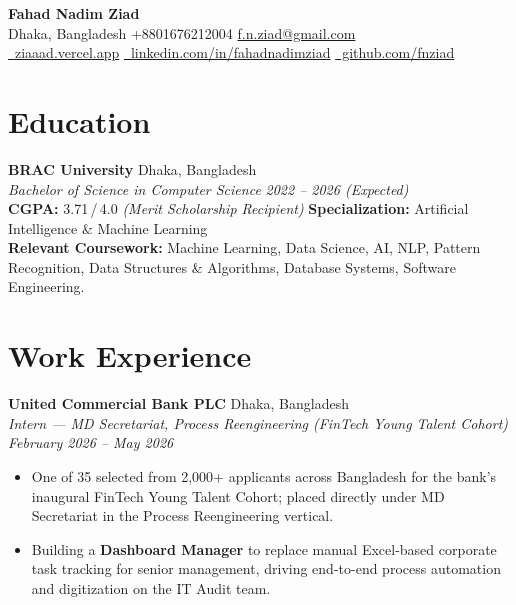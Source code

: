 \documentclass[10pt,a4paper]{article}
\newenvironment{project}{
    \begin{itemize}[leftmargin=1.0em, itemsep=1pt, topsep=1pt, parsep=1pt]
}{
    \end{itemize}
}
\begin{document}
\begin{center}
    {\Huge \bfseries Fahad Nadim Ziad}\vspace{6pt}\\
    {\small
    Dhaka, Bangladesh \textbullet{} +8801676212004 \textbullet{} \href{mailto:f.n.ziad@gmail.com}{f.n.ziad@gmail.com}\\
    \href{https://ziaaad.vercel.app}{\, ziaaad.vercel.app} \quad
    \href{https://www.linkedin.com/in/fahadnadimziad}{\, linkedin.com/in/fahadnadimziad} \quad
    \href{https://github.com/fnziad}{\, github.com/fnziad}
    }
\end{center}

\section*{Education}
\noindent\textbf{BRAC University} \hfill Dhaka, Bangladesh\\
\noindent\textit{Bachelor of Science in Computer Science} \hfill \textit{2022 -- 2026 (Expected)}\\
\noindent\textbf{CGPA:} 3.71\,/\,4.0 \quad \textit{(Merit Scholarship Recipient)} \quad \textbf{Specialization:} Artificial Intelligence \& Machine Learning\\
\noindent\textbf{Relevant Coursework:} Machine Learning, Data Science, AI, NLP, Pattern Recognition, Data Structures \& Algorithms, Database Systems, Software Engineering.
\vspace{2pt}

\section*{Work Experience}

\noindent\textbf{United Commercial Bank PLC} \hfill Dhaka, Bangladesh\\
\noindent\textit{Intern --- MD Secretariat, Process Reengineering (FinTech Young Talent Cohort)} \hfill \textit{February 2026 -- May 2026}
\begin{project}
    \item One of 35 selected from 2,000+ applicants across Bangladesh for the bank's inaugural FinTech Young Talent Cohort; placed directly under MD Secretariat in the Process Reengineering vertical.
    \item Building a \textbf{Dashboard Manager} to replace manual Excel-based corporate task tracking for senior management, driving end-to-end process automation and digitization on the IT Audit team.
\end{project}
\vspace{4pt}
\end{document}

